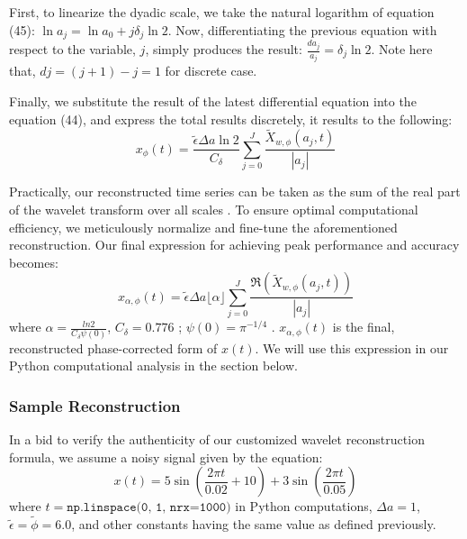 \documentclass{article}
\begin{document}
First, to linearize the dyadic scale, we take the natural logarithm of equation (45): $\ln a_{j} = \ln a_{0} + j\delta_{j} \ln2$. Now, differentiating the previous equation with respect to the variable, $j$, simply produces the result: $\frac{da_j}{a_j} = \delta_{j} \ln2$. Note here that, $dj = (j+1)-j= 1$ for discrete case. 

Finally, we substitute the result of the latest differential equation into the equation (44), and express the total results discretely, it results to the following:
\begin{equation}
x_{\phi}(t) = \frac{\tilde{\epsilon}\Delta a\ln 2}{C_{\delta}} \sum_{j=0}^{J} \frac{\tilde{X}_{w,\phi}(a_{j},t)}{|a_{j}|}
\end{equation}

Practically, our reconstructed time series can be taken as the sum
of the real part of the wavelet transform over all scales \cite{APracticalGuidetoWaveletAnalysis}. To ensure optimal computational efficiency, we meticulously normalize and fine-tune the aforementioned reconstruction. Our final expression for achieving peak performance and accuracy becomes: 
\begin{equation}
 x_{\alpha,\phi}(t) = \tilde{\epsilon}\Delta a\lfloor \alpha \rfloor\sum_{j=0}^{J} \frac{\Re (\tilde{X}_{w,\phi}(a_{j},t))}{|a_{j}|}
\end{equation}
where $\alpha=\frac{ln2}{C_{\delta}\psi(0)}$, $C_{\delta}= 0.776$ \cite{APracticalGuidetoWaveletAnalysis}; $\psi(0)=\pi^{-1/4}$ \cite{APracticalGuidetoWaveletAnalysis}.
$x_{\alpha,\phi}(t)$ is the final, reconstructed phase-corrected form of $x(t)$. We will use this expression in our Python computational analysis in the section below. 

\subsubsection{Sample Reconstruction}
In a bid to verify the authenticity of our customized wavelet reconstruction formula, we assume a noisy signal given by the equation:
\begin{equation}
   x(t) = 5\sin\left(\frac{2\pi t}{0.02} + 10\right) + 3\sin\left(\frac{2 \pi t}{0.05}\right)
\end{equation}
where $t = \texttt{np.linspace(0, 1, nrx=1000)}$ in Python computations, $\Delta a=1$, $\tilde{\epsilon}=\tilde{\phi} = 6.0$, and other constants having the same value as defined previously.

\end{document}
